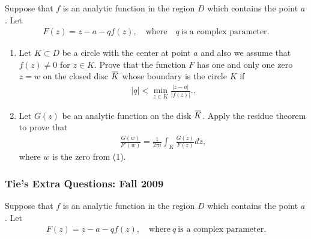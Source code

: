 \begin{problem}[?]

Suppose that \(f\) is an analytic function in the region \(D\) which
contains the point \(a\). Let
\begin{align*}F(z)= z-a-qf(z),\quad \text{where}\quad q \ \text{is a complex
parameter}.\end{align*}

\begin{enumerate}
\def\labelenumi{\arabic{enumi}.}
\item
  Let \(K\subset D\) be a circle with the center at point \(a\) and also
  we assume that \(f(z)\not =0\) for \(z\in K\). Prove that the function
  \(F\) has one and only one zero \(z=w\) on the closed disc
  \(\mkern 1.5mu\overline{\mkern-1.5muK\mkern-1.5mu}\mkern 1.5mu\) whose
  boundary is the circle \(K\) if
  \begin{align*}
  \displaystyle{ |q|<\min_{z\in K} \frac{|z-a|}{|f(z)|}.}
  .\end{align*}
\item
  Let \(G(z)\) be an analytic function on the disk
  \(\mkern 1.5mu\overline{\mkern-1.5muK\mkern-1.5mu}\mkern 1.5mu\).
  Apply the residue theorem to prove that
  \begin{align*}
  \displaystyle{ \frac{G(w)}{F'(w)}=\frac{1}{2\pi i}\int_K \frac{G(z)}{F(z)} dz,}
  \end{align*}
  where \(w\) is the zero from (1).
\end{enumerate}

\end{problem}

\hypertarget{ties-extra-questions-fall-2009-1}{%
\subsubsection{Tie's Extra Questions: Fall
2009}\label{ties-extra-questions-fall-2009-1}}

Suppose that \(f\) is an analytic function in the region \(D\) which
contains the point \(a\). Let
\begin{align*}F(z)= z-a-qf(z),\quad \text{where}~ q \ \text{is a complex parameter}.\end{align*}

